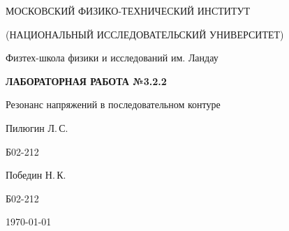 
\begin{center}
    {
        \MakeUppercase{Московский физико-технический институт}

        \MakeUppercase{(Национальный исследовательский университет)}
    }

    {
        Физтех-школа физики и исследований им. Ландау
    }
    
    \vspace{200pt}
    {
        \Huge
        \bfseries
        \MakeUppercase{Лабораторная работа №3.2.2}
    }

    \vspace{24pt}
    {
        \Large
        Резонанс напряжений в последовательном контуре
    }

    \vspace{24pt}
    {
        \large
        Пилюгин Л.\,С.

        Б02-212
    }

    {
        \large
        Победин Н.\,К.

        Б02-212
    }

    \vspace{2pt}
    {
        \large
        \today
    }
\end{center}

\newpage
{}
\setcounter{page}{2}
